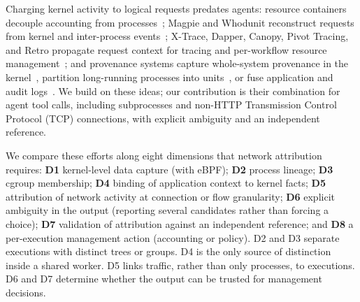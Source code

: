 Charging kernel activity to logical requests predates agents: resource containers decouple accounting from processes~\cite{banga1999resource}; Magpie and Whodunit reconstruct requests from kernel and inter-process events~\cite{barham2004magpie,chanda2007whodunit}; X-Trace, Dapper, Canopy, Pivot Tracing, and Retro propagate request context for tracing and per-workflow resource management~\cite{fonseca2007xtrace,sigelman2010dapper,kaldor2017canopy,mace2015pivot,mace2015retro}; and provenance systems capture whole-system provenance in the kernel~\cite{pasquier2017camflow}, partition long-running processes into units~\cite{lee2013beep,ma2017mpi}, or fuse application and audit logs~\cite{hassan2020omegalog,yu2021alchemist}. We build on these ideas; our contribution is their combination for agent tool calls, including subprocesses and non-HTTP Transmission Control Protocol (TCP) connections, with explicit ambiguity and an independent reference.

We compare these efforts along eight dimensions that network attribution requires: \textbf{D1} kernel-level data capture (\eg with eBPF); \textbf{D2} process lineage; \textbf{D3} cgroup membership; \textbf{D4} binding of application context to kernel facts; \textbf{D5} attribution of network activity at connection or flow granularity; \textbf{D6} explicit ambiguity in the output (\ie reporting several candidates rather than forcing a choice); \textbf{D7} validation of attribution against an independent reference; and \textbf{D8} a per-execution management action (\eg accounting or policy). D2 and D3 separate executions with distinct trees or groups. D4 is the only source of distinction inside a shared worker. D5 links traffic, rather than only processes, to executions. D6 and D7 determine whether the output can be trusted for management decisions.

